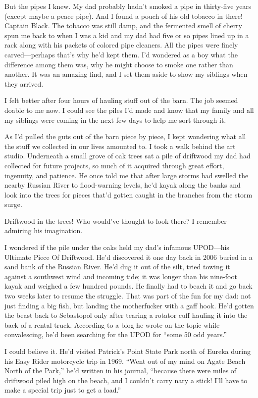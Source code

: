 \documentclass[12pt]{book}
\begin{document}
But the pipes I knew. My dad probably hadn't smoked a pipe in thirty-five years (except maybe a peace pipe). And I found a pouch of his old tobacco in there! Captain Black. The tobacco was still damp, and the fermented smell of cherry spun me back to when I was a kid and my dad had five or so pipes lined up in a rack along with his packets of colored pipe cleaners. All the pipes were finely carved---perhaps that's why he'd kept them. I'd wondered as a boy what the difference among them was, why he might choose to smoke one rather than another. It was an amazing find, and I set them aside to show my siblings when they arrived.

I felt better after four hours of hauling stuff out of the barn. The job seemed doable to me now. I could see the piles I'd made and know that my family and all my siblings were coming in the next few days to help me sort through it.

As I'd pulled the guts out of the barn piece by piece, I kept wondering what all the stuff we collected in our lives amounted to. I took a walk behind the art studio. Underneath a small grove of oak trees sat a pile of driftwood my dad had collected for future projects, so much of it acquired through great effort, ingenuity, and patience. He once told me that after large storms had swelled the nearby Russian River to flood-warning levels, he'd kayak along the banks and look into the trees for pieces that'd gotten caught in the branches from the storm surge.

Driftwood in the trees! Who would've thought to look there? I remember admiring his imagination.

I wondered if the pile under the oaks held my dad's infamous UPOD---his Ultimate Piece Of Driftwood. He'd discovered it one day back in 2006 buried in a sand bank of the Russian River. He'd dug it out of the silt, tried towing it against a southwest wind and incoming tide; it was longer than his nine-foot kayak and weighed a few hundred pounds. He finally had to beach it and go back two weeks later to resume the struggle. That was part of the fun for my dad: not just finding a big fish, but landing the motherfucker with a gaff hook. He'd gotten the beast back to Sebastopol only after tearing a rotator cuff hauling it into the back of a rental truck. According to a blog he wrote on the topic while convalescing, he'd been searching for the UPOD for ``some 50 odd years.''

I could believe it. He'd visited Patrick's Point State Park north of Eureka during his Easy Rider motorcycle trip in 1969. ``Went out of my mind on Agate Beach North of the Park,'' he'd written in his journal, ``because there were miles of driftwood piled high on the beach, and I couldn't carry nary a stick! I'll have to make a special trip just to get a load.''
\end{document}
